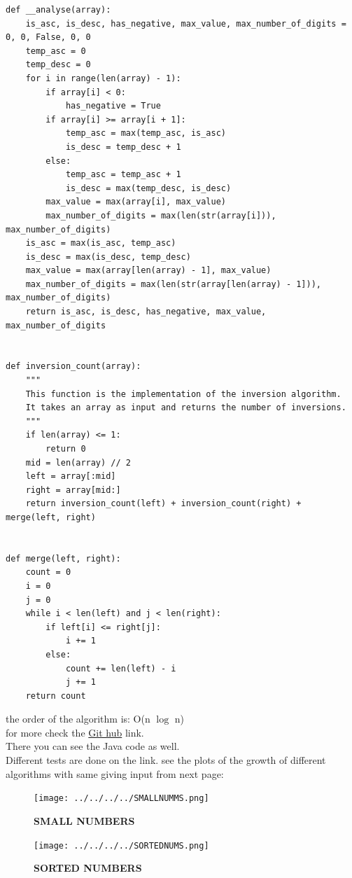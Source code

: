 \documentclass[
10pt, %
a4paper, %
oneside, %
headinclude,footinclude, %
BCOR5mm, %
]{scrartcl}
\begin{document}
\begin{lstlisting}
def __analyse(array):
    is_asc, is_desc, has_negative, max_value, max_number_of_digits = 0, 0, False, 0, 0
    temp_asc = 0
    temp_desc = 0
    for i in range(len(array) - 1):
        if array[i] < 0:
            has_negative = True
        if array[i] >= array[i + 1]:
            temp_asc = max(temp_asc, is_asc)
            is_desc = temp_desc + 1
        else:
            temp_asc = temp_asc + 1
            is_desc = max(temp_desc, is_desc)
        max_value = max(array[i], max_value)
        max_number_of_digits = max(len(str(array[i])), max_number_of_digits)
    is_asc = max(is_asc, temp_asc)
    is_desc = max(is_desc, temp_desc)
    max_value = max(array[len(array) - 1], max_value)
    max_number_of_digits = max(len(str(array[len(array) - 1])), max_number_of_digits)
    return is_asc, is_desc, has_negative, max_value, max_number_of_digits


def inversion_count(array):
    """
    This function is the implementation of the inversion algorithm.
    It takes an array as input and returns the number of inversions.
    """
    if len(array) <= 1:
        return 0
    mid = len(array) // 2
    left = array[:mid]
    right = array[mid:]
    return inversion_count(left) + inversion_count(right) + merge(left, right)


def merge(left, right):
    count = 0
    i = 0
    j = 0
    while i < len(left) and j < len(right):
        if left[i] <= right[j]:
            i += 1
        else:
            count += len(left) - i
            j += 1
    return count

\end{lstlisting}
the order of the algorithm is: O(n $\log$ n)
\\
for more check the \href{https://github.com/prhdm/Best-sorting-algorithm}{Git hub} link.
\\
There you can see the Java code as well.
\\
Different tests are done on the link. 
see the plots of the growth of different algorithms with same giving input from next page:



 \begin{figure}[htbp]
\centerline{\texttt{[image: ../../../../SMALLNUMMS.png]} }
\caption{\textbf{SMALL NUMBERS}}
\label{fig}
\end{figure}
 

 \begin{figure}[htbp]
\centerline{ \texttt{[image: ../../../../SORTEDNUMS.png]} }
\caption{\textbf{SORTED NUMBERS}}
\label{fig}
\end{figure}
\end{document}
